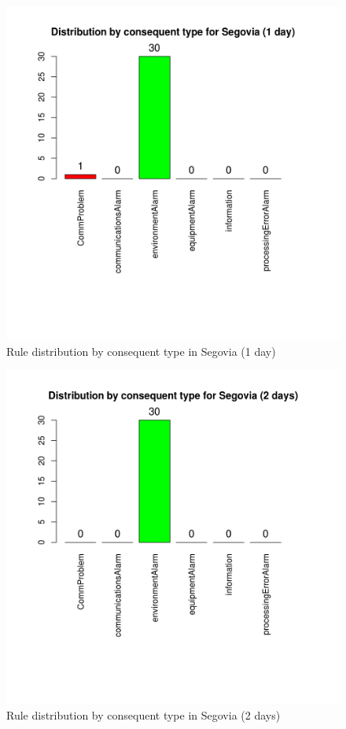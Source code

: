 \begin{figure}[hbtp]
\includegraphics[width=\textwidth]{img/conseqtypes_seg1.png}
\caption{Rule distribution by consequent type in Segovia (1 day)} \label{fig:conseqtypes_seg1}
\end{figure}

\begin{figure}[hbtp]
\includegraphics[width=\textwidth]{img/conseqtypes_seg2.png}
\caption{Rule distribution by consequent type in Segovia (2 days)} \label{fig:conseqtypes_seg2}
\end{figure}

